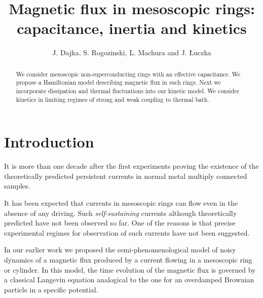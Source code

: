 \documentclass[a4paper,final]{appolb}
\begin{document}
\newcommand{\rys}[3]{\begin{figure}[th]
 \special{psfile=./#1 angle=270 hscale=55
vscale=55 hoffset=-50 voffset=30 }\label{#2} \vspace{10cm} \caption{
#3}
\end{figure}}

\title{{\bf Magnetic flux in mesoscopic rings: capacitance, inertia and kinetics}
}
\author{  J. Dajka,   S. Rogozinski, L. Machura 
 and J. \L uczka
 \address{Institute of Physics, University of Silesia, 
    40-007 Katowice, Poland}}


\date{}
\maketitle
\begin{abstract} 
We consider  mesoscopic non-superconducting rings with an effective 
capacitance. We  propose a 
Hamiltonian model describing  magnetic flux in such  rings. 
Next we incorporate dissipation and thermal fluctuations into our 
kinetic model.   
We consider kinetics in  limiting regimes of strong and weak coupling to thermal bath.

\end{abstract}


\section{Introduction}
It is more than one decade after the first experiments \cite{buh}  proving the 
existence of the theoretically predicted \cite{hund,but} persistent 
currents in normal metal multiply connected samples. 

It has been expected  \cite{koh} that currents in mesoscopic rings can flow even 
in the absence of any driving. Such {\it self-sustaining} currents although theoretically 
predicted have not been observed so far.  One of the  reasons 
is that  precise experimental regimes for observation of such currents 
have not been suggested.    

In our earlier work \cite{daj1} we proposed the semi-phenomenological  
model of noisy dynamics of a magnetic flux 
produced by a current flowing in a mesoscopic ring or cylinder.   
In this model, the time evolution of the magnetic flux 
is governed by a classical Langevin  equation analogical 
to the one  for an overdamped  Brownian particle in a specific potential. 
\end{document}

